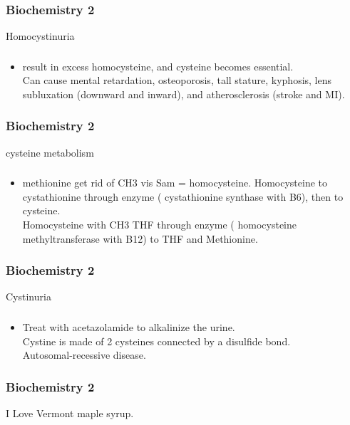 \documentclass[11pt]{beamer}
\begin{document}
\begin{frame}
 \frametitle{Biochemistry 2}
Homocystinuria
\end{frame}

\begin{frame}
 \frametitle{}
\begin{itemize}
\item result in excess homocysteine, and cysteine becomes essential. \\ Can cause mental retardation, osteoporosis, tall stature, kyphosis, lens subluxation (downward and inward), and atherosclerosis (stroke and MI).
\end{itemize}
\end{frame}

\begin{frame}
 \frametitle{Biochemistry 2}
cysteine metabolism 
\end{frame}

\begin{frame}
 \frametitle{}
\begin{itemize}
\item methionine get rid of CH3 vis Sam = homocysteine. Homocysteine to cystathionine through enzyme ( cystathionine synthase with B6), then to cysteine.  \\ Homocysteine with CH3 THF through enzyme ( homocysteine methyltransferase with B12) to THF and Methionine. 
\end{itemize}
\end{frame}

\begin{frame}
 \frametitle{Biochemistry 2}
Cystinuria
\end{frame}

\begin{frame}
 \frametitle{}
\begin{itemize}
\item Treat with acetazolamide to alkalinize the urine. \\ Cystine is made of 2 cysteines connected by a disulfide bond. \\ Autosomal-recessive disease.
\end{itemize}
\end{frame}

\begin{frame}
 \frametitle{Biochemistry 2}
I Love Vermont maple syrup.
\end{frame}
\end{document}
